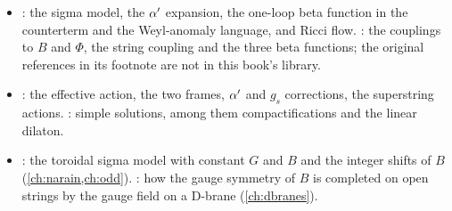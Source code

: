 \begin{itemize}[leftmargin=*,itemsep=2pt]
\item {}: the sigma model, the $\alpha'$ expansion, the one-loop
  beta function in the counterterm and the Weyl-anomaly language, and Ricci flow.
  : the couplings to $B$ and $\Phi$, the string coupling and
  the three beta functions; the original references in its footnote are not in this
  book's library.
\item {}: the effective action, the two frames, $\alpha'$ and
  $g_s$ corrections, the superstring actions. : simple
  solutions, among them compactifications and the linear dilaton.
\item {}: the toroidal sigma model with constant
  $G$ and $B$ and the integer shifts of $B$ (\cref{ch:narain,ch:odd}).
  : how the gauge symmetry of $B$ is completed on open
  strings by the gauge field on a D-brane (\cref{ch:dbranes}).
\end{itemize}
